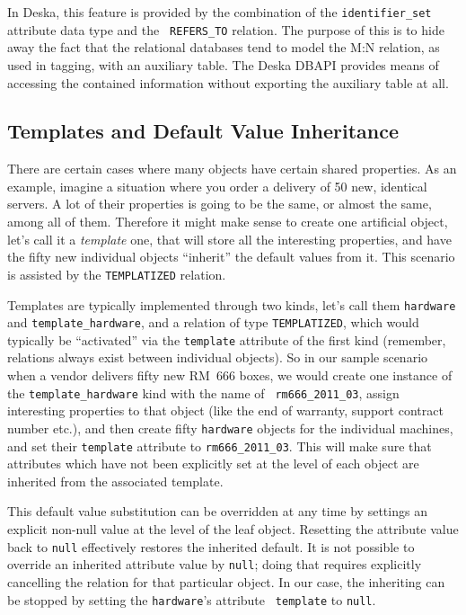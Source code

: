 \documentclass{article}
\begin{document}
In Deska, this feature is provided by the combination of the {\tt identifier\_set} attribute data type and the {\tt
REFERS\_TO} relation.  The purpose of this is to hide away the fact that the relational databases tend to model the M:N
relation, as used in tagging, with an auxiliary table.  The Deska DBAPI provides means of accessing the contained
information without exporting the auxiliary table at all.

\subsection{Templates and Default Value Inheritance}

There are certain cases where many objects have certain shared properties.  As an example, imagine a situation where you
order a delivery of 50 new, identical servers.  A lot of their properties is going to be the same, or almost the same,
among all of them.  Therefore it might make sense to create one artificial object, let's call it a {\em template} one,
that will store all the interesting properties, and have the fifty new individual objects ``inherit'' the default values
from it.  This scenario is assisted by the {\tt TEMPLATIZED} relation.

Templates are typically implemented through two kinds, let's call them {\tt hardware} and {\tt template\_hardware}, and
a relation of type {\tt TEMPLATIZED}, which would typically be ``activated'' via the {\tt template} attribute of the
first kind (remember, relations always exist between individual objects).  So in our sample scenario when a vendor
delivers fifty new RM~666 boxes, we would create one instance of the {\tt template\_hardware} kind with the name of {\tt
rm666\_2011\_03}, assign interesting properties to that object (like the end of warranty, support contract number etc.),
and then create fifty {\tt hardware} objects for the individual machines, and set their {\tt template} attribute to
{\tt rm666\_2011\_03}.  This will make sure that attributes which have not been explicitly set at the level of each
object are inherited from the associated template.

This default value substitution can be overridden at any time by settings an explicit non-null value at the level of the
leaf object.  Resetting the attribute value back to {\tt null} effectively restores the inherited default.  It is not
possible to override an inherited attribute value by {\tt null}; doing that requires explicitly cancelling the relation
for that particular object.  In our case, the inheriting can be stopped by setting the {\tt hardware}'s attribute {\tt
template} to {\tt null}.
\end{document}
